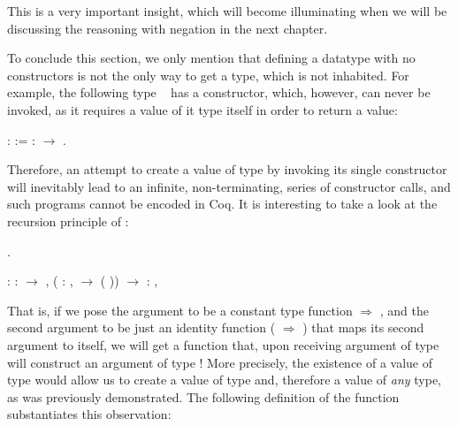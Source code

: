 This is a very important insight, which will become illuminating when
we will be discussing the reasoning with negation in the next chapter.


To conclude this section, we only mention that defining a datatype
with no constructors is not the only way to get a type, which is not
inhabited. For example, the following type
~\cite{Bertot-Casteran:BOOK} has a constructor, which,
however, can never be invoked, as it requires a value of it type
itself in order to return a value: \begin{coqdoccode}
\coqdocemptyline
\coqdocnoindent
{}  :  :=   :  \ensuremath{\rightarrow} .\coqdoceol
\coqdocemptyline
\end{coqdoccode}


Therefore, an attempt to create a value of type  by invoking
its single constructor will inevitably lead to an infinite,
non-terminating, series of constructor calls, and such programs cannot
be encoded in Coq. It is interesting to take a look at the recursion
principle of :


\begin{coqdoccode}
\coqdocemptyline
\coqdocnoindent
{} .\coqdoceol
\coqdocemptyline
\end{coqdoccode}


\coqdoceol
\coqdocemptyline
\coqdocnoindent
{}\coqdoceol
\coqdocindent{2.50em}
: \coqdockw{\ensuremath{\forall}}  :  \ensuremath{\rightarrow} ,\coqdoceol
\coqdocindent{3.50em}
(\coqdockw{\ensuremath{\forall}}  : ,   \ensuremath{\rightarrow}  ( )) \ensuremath{\rightarrow} \coqdockw{\ensuremath{\forall}}  : ,  

\coqdocemptyline


That is, if we pose the argument  to be a constant type function
 \coqdocvar{\_} \ensuremath{\Rightarrow} , and the second argument to be just an identity
function ( \coqdocvar{\_}  \ensuremath{\Rightarrow} ) that maps its second argument to itself, we
will get a function that, upon receiving argument of type 
will construct an argument of type ! More precisely, the
existence of a value of type  would allow us to create a
value of type  and, therefore a value of \textit{any} type, as was
previously demonstrated. The following definition of the function
 substantiates this observation:


